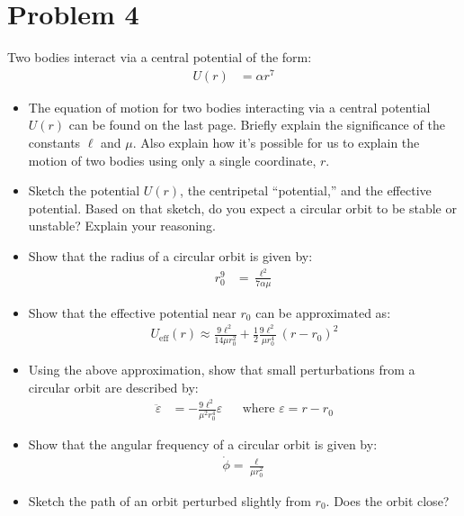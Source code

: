 \documentclass{article}
\begin{document}
\newpage

\section*{Problem 4}

Two bodies interact via a central potential of the form:
\begin{align*}
    U(r) &= \alpha r^7
\end{align*}

\begin{itemize}
    \item The equation of motion for two bodies interacting via a central potential $U(r)$ can be found on the last page. Briefly explain the significance of the constants $\ell$ and $\mu$. Also explain how it's possible for us to explain the motion of two bodies using only a single coordinate, $r$. 
    \item Sketch the potential $U(r)$, the centripetal ``potential,'' and the effective potential. Based on that sketch, do you expect a circular orbit to be stable or unstable? Explain your reasoning.
    \item Show that the radius of a circular orbit is given by:
    \begin{align*}
        r_0^9 &= \frac{\ell^2}{7 \alpha \mu}
    \end{align*}
    \item Show that the effective potential near $r_0$ can be approximated as:
    \begin{align*}
        U_\text{eff}(r) \approx \frac{9 \ell^2}{14 \mu r_0^2} + \frac{1}{2} \frac{9 \ell^2}{\mu r_0^4} \, (r - r_0)^2
    \end{align*}
    \item Using the above approximation, show that small perturbations from a circular orbit are described by:
    \begin{align*}
        \ddot{\varepsilon} &= - \frac{9 \ell^2}{\mu^2 r_0^4} \varepsilon &
        & \text{where $\varepsilon = r - r_0$}
    \end{align*}
    \item Show that the angular frequency of a circular orbit is given by:
    \begin{align*}
        \dot{\phi} = \frac{\ell}{\mu r_0^2}
    \end{align*}
    \item Sketch the path of an orbit perturbed slightly from $r_0$. Does the orbit close?
\end{itemize}
\end{document}
